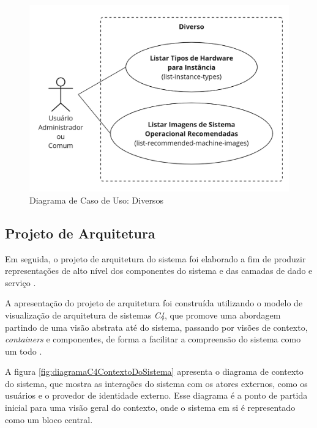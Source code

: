\begin{figure}[H]
\caption{Diagrama de Caso de Uso: Diversos}
\label{fig:casoDeUsoDiversos}
\includegraphics[width=\textwidth]{capitulos/2-metodologia/files/use-case-misc.png}
\end{figure}

\subsection{Projeto de Arquitetura}
\label{subsec:projetoDeArquitetura}

Em seguida, o projeto de arquitetura do sistema foi elaborado a fim de produzir representações de alto nível dos componentes do sistema e das camadas de dado e serviço \citep{pressman2016}.

A apresentação do projeto de arquitetura foi construída utilizando o modelo de visualização de arquitetura de sistemas \textit{C4}, que promove uma abordagem partindo de uma visão abstrata até do sistema, passando por visões de contexto, \textit{containers} e componentes, de forma a facilitar a compreensão do sistema como um todo \citep{brown2018}.

A figura \autoref{fig:diagramaC4ContextoDoSistema} apresenta o diagrama de contexto do sistema, que mostra as interações do sistema com os atores externos, como os usuários e o provedor de identidade externo. Esse diagrama é a ponto de partida inicial para uma visão geral do contexto, onde o sistema em si é representado como um bloco central.

